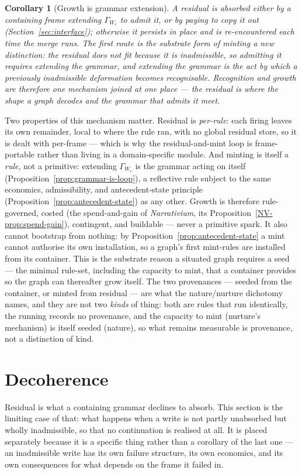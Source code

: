\documentclass[11pt,a4paper]{article}
\newtheorem{corollary}[definition]{Corollary}
\theoremstyle{remark}\newtheorem{remark}[definition]{Remark}
\begin{document}
\begin{corollary}[Growth is grammar extension]\label{cor:mint-is-grammar}
A residual is absorbed either by a containing frame extending $\Gamma_{W_c}$ to admit it, or by paying to copy it out (Section~\ref{sec:interface}); otherwise it persists in place and is re-encountered each time the merge runs. The first route is the substrate form of \emph{minting} a new distinction: the residual does not fit because it is inadmissible, so admitting it requires extending the grammar, and extending the grammar is the act by which a previously inadmissible deformation becomes recognisable. Recognition and growth are therefore one mechanism joined at one place --- the residual is where the shape a graph decodes and the grammar that admits it meet.
\end{corollary}
Two properties of this mechanism matter. Residual is \emph{per-rule}: each firing leaves its own remainder, local to where the rule ran, with no global residual store, so it is dealt with per-frame --- which is why the residual-and-mint loop is frame-portable rather than living in a domain-specific module. And minting is itself a \emph{rule}, not a primitive: extending $\Gamma_{W_c}$ is the grammar acting on itself (Proposition~\ref{prop:grammar-is-loop}), a reflective rule subject to the same economics, admissibility, and antecedent-state principle (Proposition~\ref{prop:antecedent-state}) as any other. Growth is therefore rule-governed, costed (the spend-and-gain of \emph{Narrativium}, its Proposition~\ref{NV-prop:spend-gain}), contingent, and buildable --- never a primitive spark. It also cannot bootstrap from nothing: by Proposition~\ref{prop:antecedent-state} a mint cannot authorise its own installation, so a graph's first mint-rules are installed from its container. This is the substrate reason a situated graph requires a seed --- the minimal rule-set, including the capacity to mint, that a container provides so the graph can thereafter grow itself. The two provenances --- seeded from the container, or minted from residual --- are what the nature/nurture dichotomy names, and they are not two \emph{kinds} of thing: both are rules that run identically, the running records no provenance, and the capacity to mint (nurture's mechanism) is itself seeded (nature), so what remains measurable is provenance, not a distinction of kind.

\section{Decoherence}\label{sec:decoherence}
Residual is what a containing grammar declines to absorb. This section is the limiting case of that:
what happens when a write is not partly unabsorbed but wholly inadmissible, so that no continuation is
realised at all. It is placed separately because it is a specific thing rather than a corollary of the
last one --- an inadmissible write has its own failure structure, its own economics, and its own
consequences for what depends on the frame it failed in.
\end{document}
